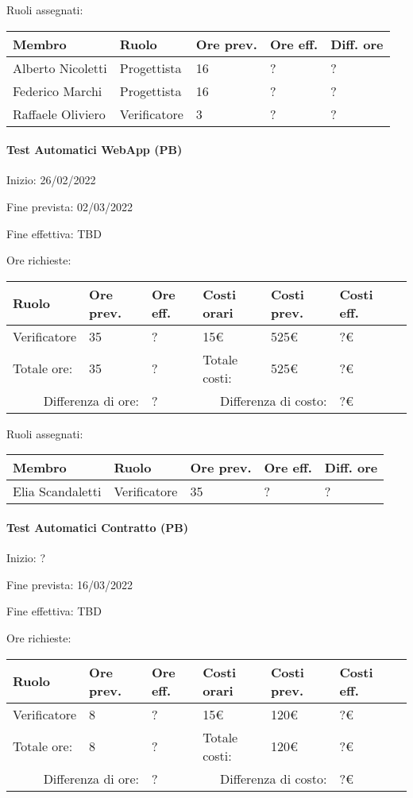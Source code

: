 \documentclass[a4paper, 12pt]{article}
\begin{document}
Ruoli assegnati:\\[0.5em]
\begin{tabular}{|l|l|l|l|l|}\hline
Membro & Ruolo & Ore prev. & Ore eff. & Diff. ore \\\hline
Alberto Nicoletti & Progettista & 16 & ? & ? \\\hline
Federico Marchi & Progettista & 16 & ? & ? \\\hline
Raffaele Oliviero & Verificatore & 3 & ? & ? \\\hline
\end{tabular}

\paragraph{Test Automatici WebApp (PB)}
Inizio: 26/02/2022\par
Fine prevista: 02/03/2022\par
Fine effettiva: TBD

Ore richieste:\\[0.5em]
\begin{tabular}{|l|l|l||l|l|l|l|}\hline
Ruolo & Ore prev. & Ore eff. & Costi orari & Costi prev. & Costi eff.\\\hline
Verificatore & 35 & ? & 15\euro & 525\euro & ?\euro \\\hline
Totale ore: & 35 & ? & Totale costi: & 525\euro & ?\euro \\\hline
\multicolumn{2}{|r|}{Differenza di ore:} & ? & \multicolumn{2}{r|}{Differenza di costo:} & ?\euro \\\hline
\end{tabular}

Ruoli assegnati:\\[0.5em]
\begin{tabular}{|l|l|l|l|l|}\hline
Membro & Ruolo & Ore prev. & Ore eff. & Diff. ore \\\hline
Elia Scandaletti & Verificatore & 35 & ? & ? \\\hline
\end{tabular}

\paragraph{Test Automatici Contratto (PB)}
Inizio: ?\par
Fine prevista: 16/03/2022\par
Fine effettiva: TBD

Ore richieste:\\[0.5em]
\begin{tabular}{|l|l|l||l|l|l|l|}\hline
Ruolo & Ore prev. & Ore eff. & Costi orari & Costi prev. & Costi eff.\\\hline
Verificatore & 8 & ? & 15\euro & 120\euro & ?\euro \\\hline
Totale ore: & 8 & ? & Totale costi: & 120\euro & ?\euro \\\hline
\multicolumn{2}{|r|}{Differenza di ore:} & ? & \multicolumn{2}{r|}{Differenza di costo:} & ?\euro \\\hline
\end{tabular}
\end{document}
